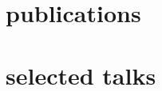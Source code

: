 \documentclass[]{luger-cv} %
\begin{document}
\ifdefined \withpubs
    \section{publications}
    \begin{list}{}{\pubslist}
        
    \end{list}
    \vspace{1em}
\fi


\ifdefined \withtalks
    \section{selected talks}
    \begin{list}{}{\pubslist}
        
    \end{list}
\fi
\end{document}

